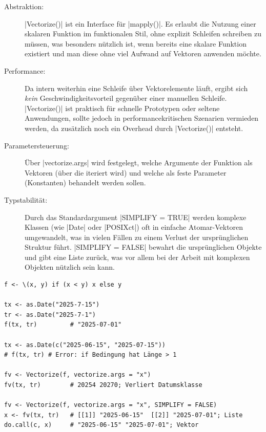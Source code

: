 \documentclass[10pt,twocolumn]{scrartcl}
\renewcommand{\lstinline}{\mycoloredinline}
\begin{document}
\begin{description}
\item[Abstraktion:] \lstinline|Vectorize()| ist ein Interface für \lstinline|mapply()|. Es erlaubt die Nutzung einer skalaren Funktion im funktionalen Stil, ohne explizit Schleifen schreiben zu müssen, was besonders nützlich ist, wenn bereits eine skalare Funktion existiert und man diese ohne viel Aufwand auf Vektoren anwenden möchte.
\item[Performance:] Da intern weiterhin eine Schleife über Vektorelemente läuft, ergibt sich \emph{kein} Geschwindigkeitsvorteil gegenüber einer manuellen Schleife. \lstinline|Vectorize()| ist praktisch für schnelle Prototypen oder seltene Anwendungen, sollte jedoch in performancekritischen Szenarien vermieden werden, da zusätzlich noch ein Overhead durch \lstinline|Vectorize()| entsteht.
\item[Parametersteuerung:] Über \lstinline|vectorize.args| wird festgelegt, welche Argumente der Funktion als Vektoren (über die iteriert wird) und welche als feste Parameter (Konstanten) behandelt werden sollen.
\item[Typstabilität:] Durch das Standardargument \lstinline|SIMPLIFY = TRUE| werden komplexe Klassen (wie \lstinline|Date| oder \lstinline|POSIXct|) oft in einfache Atomar-Vektoren umgewandelt, was in vielen Fällen zu einem Verlust der ursprünglichen Struktur führt. \lstinline|SIMPLIFY = FALSE| bewahrt die ursprünglichen Objekte und gibt eine Liste zurück, was vor allem bei der Arbeit mit komplexen Objekten nützlich sein kann.
\end{description}

\begin{lstlisting}
f <- \(x, y) if (x < y) x else y

tx <- as.Date("2025-7-15")
tr <- as.Date("2025-7-1")
f(tx, tr)         # "2025-07-01"

tx <- as.Date(c("2025-06-15", "2025-07-15"))
# f(tx, tr) # Error: if Bedingung hat Länge > 1

fv <- Vectorize(f, vectorize.args = "x")
fv(tx, tr)        # 20254 20270; Verliert Datumsklasse

fv <- Vectorize(f, vectorize.args = "x", SIMPLIFY = FALSE)
x <- fv(tx, tr)   # [[1]] "2025-06-15"  [[2]] "2025-07-01"; Liste
do.call(c, x)     # "2025-06-15" "2025-07-01"; Vektor
\end{lstlisting}


\end{document}
